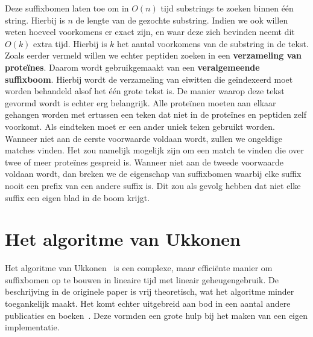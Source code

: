 Deze suffixbomen laten toe om in $O(n)$ tijd substrings te zoeken binnen één string.
Hierbij is $n$ de lengte van de gezochte substring.
Indien we ook willen weten hoeveel voorkomens er exact zijn, en waar deze zich bevinden neemt dit $O(k)$ extra tijd.
Hierbij is $k$ het aantal voorkomens van de substring in de tekst.
Zoals eerder vermeld willen we echter peptiden zoeken in een \textbf{verzameling van proteïnes}.
Daarom wordt gebruikgemaakt van een \textbf{veralgemeende suffixboom}.
Hierbij wordt de verzameling van eiwitten die geïndexeerd moet worden behandeld alsof het één grote tekst is.
De manier waarop deze tekst gevormd wordt is echter erg belangrijk.
Alle proteïnen moeten aan elkaar gehangen worden met ertussen een teken dat niet in de proteïnes en peptiden zelf voorkomt.
Als eindteken moet er een ander uniek teken gebruikt worden.
Wanneer niet aan de eerste voorwaarde voldaan wordt, zullen we ongeldige matches vinden.
Het zou namelijk mogelijk zijn om een match te vinden die over twee of meer proteïnes gespreid is.
Wanneer niet aan de tweede voorwaarde voldaan wordt, dan breken we de eigenschap van suffixbomen waarbij elke suffix nooit een prefix van een andere suffix is.
Dit zou als gevolg hebben dat niet elke suffix een eigen blad in de boom krijgt.

\section{Het algoritme van Ukkonen}\label{sec:Ukkonen}
Het algoritme van Ukkonen~\cite{Ukkonen1995} is een complexe, maar efficiënte manier om suffixbomen op te bouwen in lineaire tijd met lineair geheugengebruik.
De beschrijving in de originele paper is vrij theoretisch, wat het algoritme minder toegankelijk maakt.
Het komt echter uitgebreid aan bod in een aantal andere publicaties en boeken~\cite{Gusfield1997, AD3_ukkonen, CCB_course, Ukkonen_CCB}.
Deze vormden een grote hulp bij het maken van een eigen implementatie.

